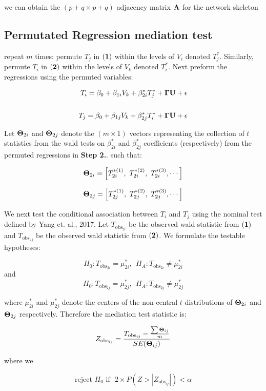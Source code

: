 \documentclass[12pt]{report}
\begin{document}
we can obtain the $(p+q \times p+q)$ adjacency matrix $\bf A$ for the network skeleton\\

\subsection*{Permutated Regression mediation test}
 repeat $m$ times: permute $T_j$ in $\bf (1)$ within the levels of $V_i$ denoted $T_j^{\ast}$. Similarly, permute $T_i$ in $\bf (2)$ within the levels of $V_k$ denoted $T_i^{\ast}$. Next preform the regressions using the permuted variables:

\begin{eqnarray}
T_i = \beta_0 +\beta_{1i}V_k+\beta_{2i}^{\ast}T_j^{\ast}+{\bf \Gamma U}+ \epsilon \\
\nonumber\\
T_j = \beta_0 +\beta_{1j}V_k+\beta_{2j}^{\ast}T_i^{\ast}+{\bf \Gamma U}+ \epsilon \nonumber 
\end{eqnarray}

 Let ${\bf \Theta}_{2i}$ and ${\bf \Theta}_{2j}$ denote the $(m \times 1)$ vectors representing the collection of $t$ statistics from the wald tests on $\beta_{2i}^{\ast}$ and $\beta_{2j}^{\ast}$ coefficients (respectively) from the permuted regressions in \textbf{Step 2.}. such that:

\[ {\bf \Theta}_{2i} = \left[ T_{2i}^{\ast (1)}, \ T_{2i}^{\ast (2)}, \ T_{2i}^{\ast (3)}, \cdots \right] \]

\[ {\bf \Theta}_{2j} = \left[ T_{2j}^{\ast (1)}, \ T_{2j}^{\ast (2)}, \ T_{2j}^{\ast (3)}, \cdots \right]  \]

We next test the conditional association between $T_i$ and $T_j$ using the nominal test defined by Yang et. al., 2017. Let $T_{\text{obs}_{2i}}$ be the observed wald statistic from $\bf (1)$ and $T_{\text{obs}_{2j}}$ be the observed wald statistic from $\bf(2)$. We formulate the testable hypotheses: 

\[ H_0: T_{\text{obs}_{2i}} = \mu_{2i}^{\ast}, \ \ H_A: T_{\text{obs}_{2i}} \neq \mu_{2i}^{\ast} \]
and
\[ H_0: T_{\text{obs}_{2j}} = \mu_{2j}^{\ast}, \ \ H_A: T_{\text{obs}_{2j}} \neq \mu_{2j}^{\ast} \]

where $\mu_{2i}^{\ast}$ and $\mu_{2j}^{\ast}$ denote the centers of the non-central $t$-distributions of ${\bf \Theta}_{2i}$ and ${\bf \Theta}_{2j}$ respectively. Therefore the mediation test statistic is:

\[ Z_{\text{obs}_{ij}} = \frac{T_{\text{obs}_{ij}} - \frac{\sum {\bf \Theta}_{ij}}{m} }{SE({\bf \Theta}_{ij})} \]

where we 

\[ \text{reject $H_0$ if} \ \ \ 2\times P(Z >  |Z_{\text{obs}_{ij}}|) < \alpha \]
\end{document}
